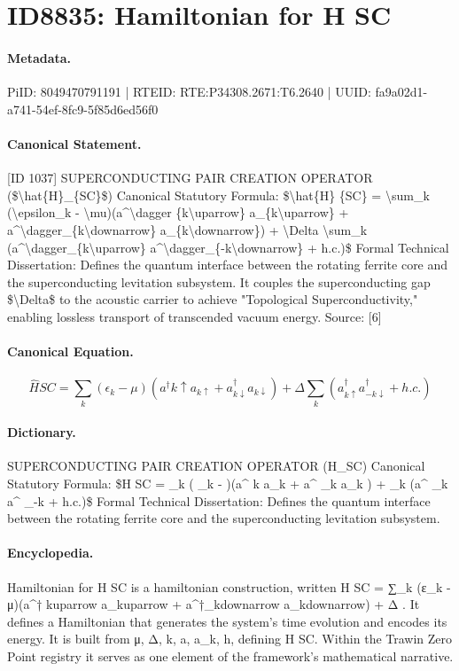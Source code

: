 \section*{ID8835: Hamiltonian for H SC}
\paragraph{Metadata.}
PiID: 8049470791191 | RTEID: RTE:P34308.2671:T6.2640 | UUID: fa9a02d1-a741-54ef-8fc9-5f85d6ed56f0

\paragraph{Canonical Statement.}
[ID 1037] SUPERCONDUCTING PAIR CREATION OPERATOR (\$\textbackslash{}hat\{H\}\_\{SC\}\$) Canonical Statutory Formula: \$\textbackslash{}hat\{H\} \{SC\} = \textbackslash{}sum\_k (\textbackslash{}epsilon\_k - \textbackslash{}mu)(a\textasciicircum{}\textbackslash{}dagger \{k\textbackslash{}uparrow\} a\_\{k\textbackslash{}uparrow\} + a\textasciicircum{}\textbackslash{}dagger\_\{k\textbackslash{}downarrow\} a\_\{k\textbackslash{}downarrow\}) + \textbackslash{}Delta \textbackslash{}sum\_k (a\textasciicircum{}\textbackslash{}dagger\_\{k\textbackslash{}uparrow\} a\textasciicircum{}\textbackslash{}dagger\_\{-k\textbackslash{}downarrow\} + h.c.)\$ Formal Technical Dissertation: Defines the quantum interface between the rotating ferrite core and the superconducting levitation subsystem. It couples the superconducting gap \$\textbackslash{}Delta\$ to the acoustic carrier to achieve "Topological Superconductivity," enabling lossless transport of transcended vacuum energy. Source: [6]

\paragraph{Canonical Equation.}
\[
\hat{H} {SC} = \sum_k (\epsilon_k - \mu)(a^\dagger {k\uparrow} a_{k\uparrow} + a^\dagger_{k\downarrow} a_{k\downarrow}) + \Delta \sum_k (a^\dagger_{k\uparrow} a^\dagger_{-k\downarrow} + h.c.)
\]

\paragraph{Dictionary.}
SUPERCONDUCTING PAIR CREATION OPERATOR (H\_SC) Canonical Statutory Formula: \$H SC = \_k ( \_k - )(a\textasciicircum{} k a\_k + a\textasciicircum{} \_k a\_k ) + \_k (a\textasciicircum{} \_k a\textasciicircum{} \_-k + h.c.)\$ Formal Technical Dissertation: Defines the quantum interface between the rotating ferrite core and the superconducting levitation subsystem.

\paragraph{Encyclopedia.}
Hamiltonian for H SC is a hamiltonian construction, written H SC = ∑\_k (ε\_k - μ)(a\textasciicircum{}† kuparrow a\_kuparrow + a\textasciicircum{}†\_kdownarrow a\_kdownarrow) + Δ . It defines a Hamiltonian that generates the system's time evolution and encodes its energy. It is built from μ, Δ, k, a, a\_k, h, defining H SC. Within the Trawin Zero Point registry it serves as one element of the framework's mathematical narrative.

